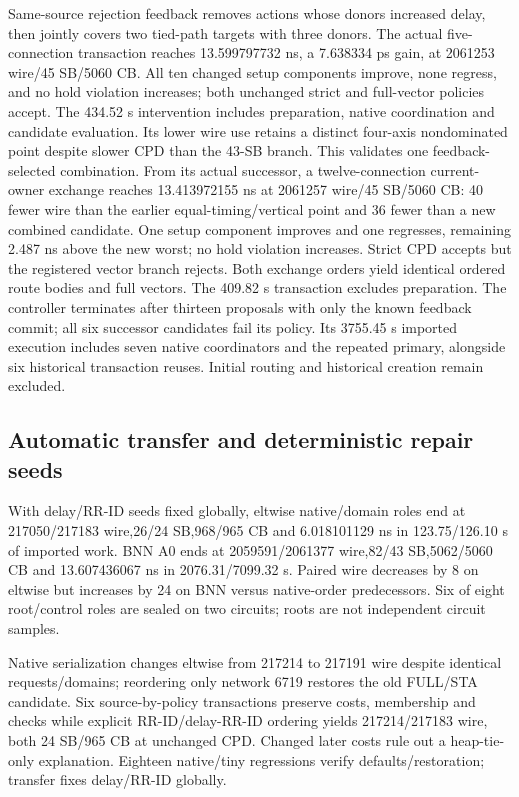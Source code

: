 \documentclass[conference,10pt]{IEEEtran}
\begin{document}
Same-source rejection feedback removes actions whose donors increased delay, then jointly covers two tied-path targets with three donors. The actual five-connection transaction reaches 13.599797732 ns, a 7.638334 ps gain, at 2061253 wire/45 SB/5060 CB. All ten changed setup components improve, none regress, and no hold violation increases; both unchanged strict and full-vector policies accept. The 434.52 s intervention includes preparation, native coordination and candidate evaluation. Its lower wire use retains a distinct four-axis nondominated point despite slower CPD than the 43-SB branch. This validates one feedback-selected combination. From its actual successor, a twelve-connection current-owner exchange reaches 13.413972155 ns at 2061257 wire/45 SB/5060 CB: 40 fewer wire than the earlier equal-timing/vertical point and 36 fewer than a new combined candidate. One setup component improves and one regresses, remaining 2.487 ns above the new worst; no hold violation increases. Strict CPD accepts but the registered vector branch rejects. Both exchange orders yield identical ordered route bodies and full vectors. The 409.82 s transaction excludes preparation. The controller terminates after thirteen proposals with only the known feedback commit; all six successor candidates fail its policy. Its 3755.45 s imported execution includes seven native coordinators and the repeated primary, alongside six historical transaction reuses. Initial routing and historical creation remain excluded.

\subsection{Automatic transfer and deterministic repair seeds}
With delay/RR-ID seeds fixed globally, eltwise native/domain roles end at 217050/217183 wire,26/24 SB,968/965 CB and 6.018101129 ns in 123.75/126.10 s of imported work. BNN A0 ends at 2059591/2061377 wire,82/43 SB,5062/5060 CB and 13.607436067 ns in 2076.31/7099.32 s. Paired wire decreases by 8 on eltwise but increases by 24 on BNN versus native-order predecessors. Six of eight root/control roles are sealed on two circuits; roots are not independent circuit samples.

Native serialization changes eltwise from 217214 to 217191 wire despite identical requests/domains; reordering only network 6719 restores the old FULL/STA candidate. Six source-by-policy transactions preserve costs, membership and checks while explicit RR-ID/delay-RR-ID ordering yields 217214/217183 wire, both 24 SB/965 CB at unchanged CPD. Changed later costs rule out a heap-tie-only explanation. Eighteen native/tiny regressions verify defaults/restoration; transfer fixes delay/RR-ID globally.
\end{document}

